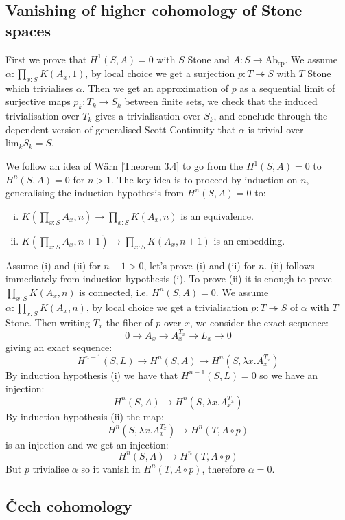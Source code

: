 \documentclass{../util/zariski}
\begin{document}
\subsection*{Vanishing of higher cohomology of Stone spaces}

First we prove that $H^1(S,A) = 0$ with $S$ Stone and  $A : S\to \mathrm{Ab}_{\mathrm{cp}}$. We assume $\alpha:\prod_{x:S}K(A_x,1)$, by local choice we get a surjection $p:T\twoheadrightarrow S$ with $T$ Stone which trivialises $\alpha$. Then we get an approximation of $p$ as a sequential limit of surjective maps $p_k:T_k\to S_k$ between finite sets, we check that the induced trivialisation over $T_k$ gives a trivialisation over $S_k$, and conclude through the dependent version of generalised Scott Continuity that $\alpha$ is trivial over $\mathrm{lim}_kS_k =S$.

We follow an idea of Wärn \cite{cech-draft}[Theorem 3.4] to go from the $H^1(S,A)=0$ to $H^n(S,A)=0$ for $n>1$. The key idea is to proceed by induction on $n$, generalising the induction hypothesis from $H^n(S,A) = 0$ to: 
\begin{enumerate}[(i)]
\item $K(\prod_{x:S}A_x,n) \to \prod_{x:S}K(A_x,n)$ is an equivalence.
\item $K(\prod_{x:S}A_x,n+1) \to \prod_{x:S}K(A_x,n+1)$ is an embedding.
\end{enumerate}
Assume (i) and (ii) for $n-1>0$, let's prove (i) and (ii) for $n$. (ii) follows immediately from induction hypothesis (i). To prove (ii) it is enough to prove $\prod_{x:S}K(A_x,n)$ is connected, i.e. $H^n(S,A)=0$. We assume $\alpha:\prod_{x:S}K(A_x,n)$, by local choice we get a trivialisation $p:T\twoheadrightarrow S$ of $\alpha$ with $T$ Stone. Then writing $T_x$ the fiber of $p$ over $x$, we consider the exact sequence:
\[0\to A_x\to A_x^{T_x}\to L_x\to 0\]
giving an exact sequence:
\[H^{n-1}(S,L)\to H^n(S,A)\to H^n(S,\lambda x. A_x^{T_x})\]
By induction hypothesis (i) we have that $H^{n-1}(S,L) = 0$ so we have an injection:
\[H^n(S,A)\to H^n(S,\lambda x. A_x^{T_x})\]
By induction hypothesis (ii) the map: 
\[H^n(S,\lambda x. A_x^{T_x}) \to H^n(T,A\circ p)\]
is an injection and we get an injection:
\[H^n(S,A)\to H^n(T,A\circ p)\] 
But $p$ trivialise $\alpha$ so it vanish in $H^n(T,A\circ p)$, therefore $\alpha=0$.

\subsection*{\v{C}ech cohomology}
\end{document}
